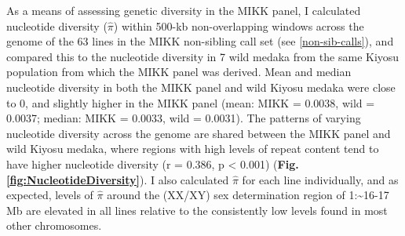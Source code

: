 \documentclass[
]{book}
\begin{document}
As a means of assessing genetic diversity in the MIKK panel, I calculated nucleotide diversity (\(\hat{\pi}\)) within 500-kb non-overlapping windows across the genome of the 63 lines in the MIKK non-sibling call set (see \ref{non-sib-calls}), and compared this to the nucleotide diversity in 7 wild medaka from the same Kiyosu population from which the MIKK panel was derived. Mean and median nucleotide diversity in both the MIKK panel and wild Kiyosu medaka were close to 0, and slightly higher in the MIKK panel (mean: MIKK = 0.0038, wild = 0.0037; median: MIKK = 0.0033, wild = 0.0031). The patterns of varying nucleotide diversity across the genome are shared between the MIKK panel and wild Kiyosu medaka, where regions with high levels of repeat content tend to have higher nucleotide diversity (r = 0.386, p \textless{} 0.001) (\textbf{Fig. \ref{fig:NucleotideDiversity}}). I also calculated \(\hat{\pi}\) for each line individually, and as expected, levels of \(\hat{\pi}\) around the (XX/XY) sex determination region of 1:\textasciitilde16-17 Mb are elevated in all lines relative to the consistently low levels found in most other chromosomes.
\end{document}

